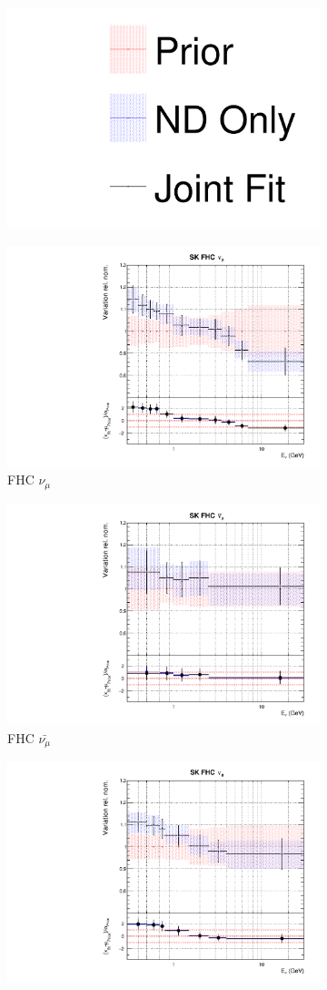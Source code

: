 \begin{figure}[!htbp]
\centering
\begin{subfigure}{0.8\textwidth}
  \centering
  \includegraphics[width=0.24\linewidth]{figs/joint_leg}
\end{subfigure}
\begin{subfigure}{0.45\textwidth}
  \centering
  \includegraphics[width=0.75\linewidth]{figs/jointflux8}
  \caption{\SK FHC $\nu_{\mu}$}
\end{subfigure}
\begin{subfigure}{0.45\textwidth}
  \centering
  \includegraphics[width=0.75\linewidth]{figs/jointflux9}
  \caption{\SK FHC $\bar{\nu_{\mu}}$}
\end{subfigure}
\begin{subfigure}{0.45\textwidth}
  \centering
  \includegraphics[width=0.75\linewidth]{figs/jointflux10}

\end{subfigure}
\end{figure}
